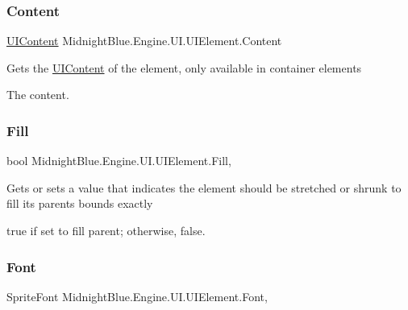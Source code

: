 \subsubsection{\texorpdfstring{Content}{Content}}
{\footnotesize\ttfamily \hyperlink{class_midnight_blue_1_1_engine_1_1_u_i_1_1_u_i_content}{U\+I\+Content} Midnight\+Blue.\+Engine.\+U\+I.\+U\+I\+Element.\+Content\hspace{0.3cm}{\ttfamily [get]}}



Gets the \hyperlink{class_midnight_blue_1_1_engine_1_1_u_i_1_1_u_i_content}{U\+I\+Content} of the element, only available in container elements 

The content.\hypertarget{class_midnight_blue_1_1_engine_1_1_u_i_1_1_u_i_element_a49f08f416fb8b80bc0fd09d8c7e5d77c}{}\label{class_midnight_blue_1_1_engine_1_1_u_i_1_1_u_i_element_a49f08f416fb8b80bc0fd09d8c7e5d77c} 
\subsubsection{\texorpdfstring{Fill}{Fill}}
{\footnotesize\ttfamily bool Midnight\+Blue.\+Engine.\+U\+I.\+U\+I\+Element.\+Fill\hspace{0.3cm}{\ttfamily [get]}, {\ttfamily [set]}}



Gets or sets a value that indicates the element should be stretched or shrunk to fill its parents bounds exactly 

{\ttfamily true} if set to fill parent; otherwise, {\ttfamily false}.\hypertarget{class_midnight_blue_1_1_engine_1_1_u_i_1_1_u_i_element_a71ad458953ae5fb4655051cda7a809f7}{}\label{class_midnight_blue_1_1_engine_1_1_u_i_1_1_u_i_element_a71ad458953ae5fb4655051cda7a809f7} 
\subsubsection{\texorpdfstring{Font}{Font}}
{\footnotesize\ttfamily Sprite\+Font Midnight\+Blue.\+Engine.\+U\+I.\+U\+I\+Element.\+Font\hspace{0.3cm}{\ttfamily [get]}, {\ttfamily [set]}}



